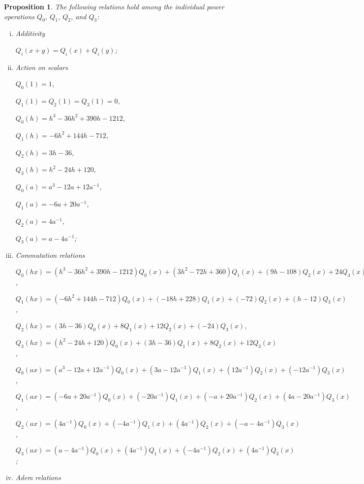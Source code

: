 \documentclass{gtpart}
\newtheorem{prop}[thm]{Proposition}
\theoremstyle{definition}
\theoremstyle{remark}
\begin{document}
\begin{prop}
\label{prop:Gamma}
 The following relations hold among the individual power operations $Q_0$, $Q_1$, $Q_2$, and $Q_3$: 
 \begin{enumerate}[(i)]
  \item Additivity 

  $Q_i(x+y) = Q_i(x) + Q_i(y)$; 

  \item Action on scalars 
  
  $Q_0(1) = 1$, 

  $Q_1(1) = Q_2(1) = Q_3(1) = 0$, 

  $Q_0(h) = h^3 - 36 h^2 + 390 h - 1212$, 

  $Q_1(h) = -6 h^2 + 144 h - 712$, 

  $Q_2(h) = 3 h - 36$, 

  $Q_3(h) = h^2 - 24 h + 120$, 

  $Q_0(a) = a^3 - 12 a + 12 a^{-1}$, 

  $Q_1(a) = -6 a + 20 a^{-1}$, 

  $Q_2(a) = 4 a^{-1}$, 

  $Q_3(a) = a - 4 a^{-1}$; 

  \item Commutation relations 

  $Q_0(h x) = (h^3 - 36 h^2 + 390 h - 1212) Q_0(x) + (3 h^2 - 72 h + 360) Q_1(x) + (9 h - 108) Q_2(x) + 24 Q_3(x)$, 

  $Q_1(h x) = (-6 h^2 + 144 h - 712) Q_0(x) + (-18 h + 228) Q_1(x) + (-72) Q_2(x) + (h - 12) Q_3(x)$, 

  $Q_2(h x) = (3 h - 36) Q_0(x) + 8 Q_1(x) + 12 Q_2(x) + (-24) Q_3(x)$, 

  $Q_3(h x) = (h^2 - 24 h + 120) Q_0(x) + (3 h - 36) Q_1(x) + 8 Q_2(x) + 12 Q_3(x)$, 

  $Q_0(a x) = (a^3 - 12 a + 12 a^{-1}) Q_0(x) + (3 a - 12 a^{-1}) Q_1(x) + (12 a^{-1}) Q_2(x) + (-12 a^{-1}) Q_3(x)$, 

  $Q_1(a x) = (-6 a + 20 a^{-1}) Q_0(x) + (-20 a^{-1}) Q_1(x) + (- a + 20 a^{-1}) Q_2(x) + (4 a - 20 a^{-1}) Q_3(x)$, 

  $Q_2(a x) = (4 a^{-1}) Q_0(x) + (-4 a^{-1}) Q_1(x) + (4 a^{-1}) Q_2(x) + (- a - 4 a^{-1}) Q_3(x)$, 

  $Q_3(a x) = (a - 4 a^{-1}) Q_0(x) + (4 a^{-1}) Q_1(x) + (-4 a^{-1}) Q_2(x) + (4 a^{-1}) Q_3(x)$; 

  \item Adem relations 


\end{enumerate}
\end{prop}
\end{document}
